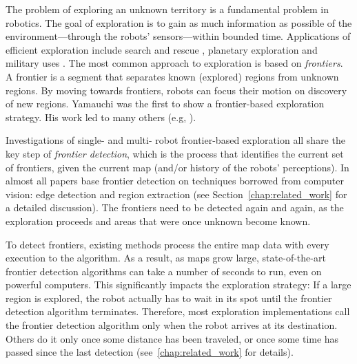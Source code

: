 The problem of exploring an unknown territory is a fundamental problem in
robotics. The goal of exploration is to gain as much information as 
possible of the environment---through the robots' sensors---within bounded time. 
Applications of efficient exploration include search and rescue \cite{Kitano99robocuprescue}, planetary exploration \cite{apostolopoulos2001robotic} and military uses \cite{hougen2000miniature}.
The most common approach to exploration is based on \emph{frontiers}. A frontier
is a segment that separates known (explored) regions from unknown regions. By
moving towards frontiers, robots can focus their motion on discovery of new
regions. Yamauchi
\cite{yamauchi_frontier-based_1997,yamauchi_frontier-based_1998} was the first
to show a frontier-based exploration strategy. His work led to many
others (e.g,
\cite{burgard_collaborative_2000,burgard05tro,lau_behavioural_2003,sawhney_fast_2009}).

Investigations of single- and multi- robot frontier-based exploration all share
the key step of \textit{frontier detection}, which is the process that identifies
the current set of frontiers, given the current map (and/or history of the robots'
perceptions).  In almost all papers  base frontier detection on techniques borrowed from computer
vision: edge detection and region extraction (see Section~\ref{chap:related_work} for
a detailed discussion).  The frontiers need to be detected again and again, as
the exploration proceeds and areas that were once unknown become known.

To detect frontiers, existing methods process the entire map data with every execution to the algorithm.
As a result, as maps grow large, state-of-the-art frontier detection algorithms can 
take a number of seconds to run, even on powerful computers. This significantly
impacts the exploration strategy:  If a large region is 
explored, the robot actually has to wait in its
spot until the frontier detection algorithm terminates. Therefore, most
exploration implementations call the frontier detection algorithm only when the
robot arrives at its destination. Others do it only once some distance has 
been traveled, or once some time has passed since the last detection 
(see~\ref{chap:related_work} for details).
 
